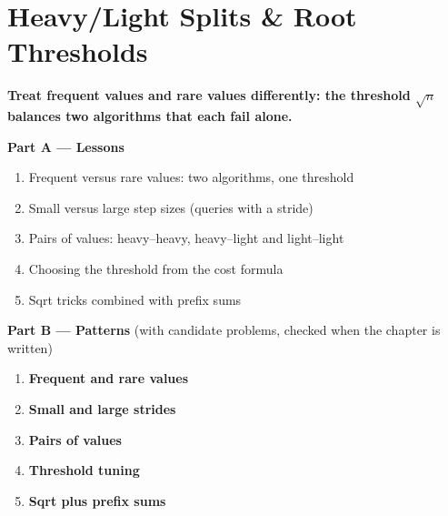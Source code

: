 \chapter{Heavy/Light Splits \& Root Thresholds}
\label{ch:heavy_light_values}

\begin{tcolorbox}[enhanced, colback=white, colframe=secondaryblue, boxrule=1pt, arc=2mm]
\textbf{\large\textcolor{primaryblue}{Treat frequent values and rare values differently: the threshold $\sqrt{n}$ balances two algorithms that each fail alone.}}
\end{tcolorbox}


\begin{plannedbox}
\textbf{Part A --- Lessons}
\begin{enumerate}[leftmargin=*, label=\textbf{A\arabic*.}, itemsep=1pt]
    \item Frequent versus rare values: two algorithms, one threshold
    \item Small versus large step sizes (queries with a stride)
    \item Pairs of values: heavy--heavy, heavy--light and light--light
    \item Choosing the threshold from the cost formula
    \item Sqrt tricks combined with prefix sums
\end{enumerate}
\textbf{Part B --- Patterns} (with candidate problems, checked when the chapter is written)
\begin{enumerate}[leftmargin=*, label=\textbf{P\arabic*.}, itemsep=1pt]
    \item \textbf{Frequent and rare values}
    \item \textbf{Small and large strides}
    \item \textbf{Pairs of values}
    \item \textbf{Threshold tuning}
    \item \textbf{Sqrt plus prefix sums}
\end{enumerate}
\end{plannedbox}

